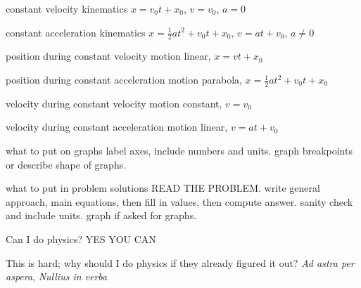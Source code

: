 \documentclass[avery5371,grid]{flashcards}
\begin{document}
\begin{flashcard}{constant velocity kinematics}
$x = v_0t+x_0$, $v=v_0$, $a=0$
\end{flashcard}
\begin{flashcard}{constant acceleration kinematics}
$x = \frac{1}{2}at^2+v_0t+x_0$, $v=at+v_0$, $a\neq 0$
\end{flashcard}
\begin{flashcard}{position during constant velocity motion}
linear, $x=vt+x_0$
\end{flashcard}
\begin{flashcard}{position during constant acceleration motion}
parabola, $x = \frac{1}{2}at^2+v_0t+x_0$
\end{flashcard}
\begin{flashcard}{velocity during constant velocity motion}
constant, $v=v_0$
\end{flashcard}
\begin{flashcard}{velocity during constant acceleration motion}
linear, $v = at+v_0$
\end{flashcard}

\begin{flashcard}{what to put on graphs}
label axes, include numbers and units. graph breakpoints or describe shape of graphs. 
\end{flashcard}
\begin{flashcard}{what to put in problem solutions}
READ THE PROBLEM. write general approach, main equations, then fill in values, then compute answer. sanity check and include units. graph if asked for graphs. 
\end{flashcard}

\begin{flashcard}{Can I do physics?}
YES YOU CAN
\end{flashcard}
\begin{flashcard}{This is hard; why should I do physics if they already figured it out?}
\emph{Ad astra per aspera}, \emph{Nullius in verba}
\end{flashcard}
\end{document}
